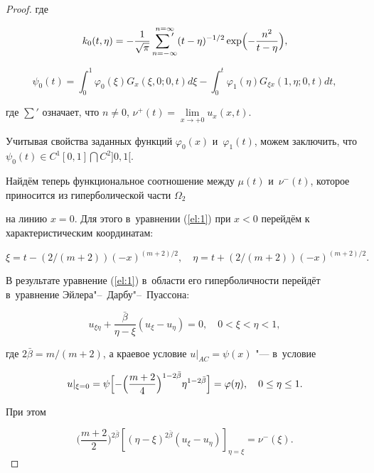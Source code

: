 \begin{proof}
где

\begin{equation} \label{el:8}

k_0(t,\eta)=-\frac{1}{\sqrt{\pi}}\mathop{\sum{\rule{0mm}{10pt}}'}\limits_{n=-\infty}^{n=\infty} (t-\eta)^{-1/2}\exp\Bigl(-\frac{n^2}{t-\eta}\Bigr),

\end{equation}



$$\psi_0(t)=\int_0^1\varphi_0(\xi)G_x(\xi,0;0,t)d\xi-\int_0^t\varphi_1(\eta)G_{\xi x}(1,\eta;0,t)dt,$$

где $\sum'$ означает, что $n\neq 0$, $\nu^+(t)=\lim\limits_{x\rightarrow +0}u_x(x,t)$.



Учитывая свойства заданных функций $\varphi_0(x)$ и~$\varphi_1(t)$, можем заключить, что $\psi_0(t)\in C^1[0, 1]\bigcap C^2]0, 1[$.

Найдём теперь функциональное соотношение между $\mu(t)$ и~$\nu^-(t)$, которое приносится из гиперболической части $\Omega_2$

на линию $x=0$. Для этого в~уравнении (\ref{el:1}) при $x<0$ перейдём к характеристическим координатам:

$$\xi=t-(2/(m+2))(-x)^{(m+2)/2}, \quad \eta=t+(2/(m+2))(-x)^{(m+2)/2}.$$



В результате уравнение (\ref{el:1}) в~области его гиперболичности перейдёт в~уравнение Эйлера"--~Дарбу"--~Пуассона:

\begin{equation} \label{el:9}

u_{\xi\eta}+\frac{\bar{\beta}}{\eta-\xi}(u_\xi-u_\eta)=0, \quad 0<\xi<\eta<1,

\end{equation}

где $2\bar{\beta}=m/(m+2)$, а краевое условие $u|_{AC}=\psi(x)$ "--- в~условие

\begin{equation} \label{el:10}

u|_{\xi=0}=\psi\Bigl[-\Bigl(\frac{m+2}{4}\Bigr)^{1-2\bar{\beta}}\eta^{1-2\bar{\beta}}\Bigr]=\varphi(\eta), \quad 0\leq\eta\leq1.

\end{equation}

При этом

\begin{equation} \label{el:11}

\Big(\frac{m+2}{2}\Bigr)^{2\bar{\beta}}\left[(\eta-\xi)^{2\bar{\beta}}(u_\xi-u_\eta)\right]_{\eta=\xi}=\nu^-(\xi).


\end{equation}
\end{proof}
